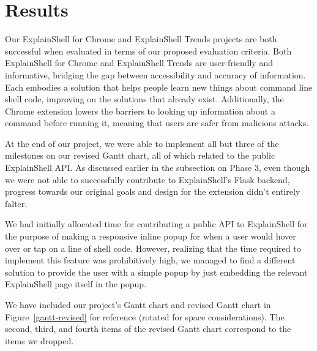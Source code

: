 \documentclass[11pt]{article}
\begin{document}
\section{Results}

Our ExplainShell for Chrome and ExplainShell Trends projects are both successful
when evaluated in terms of our proposed evaluation criteria. Both ExplainShell
for Chrome and ExplainShell Trends are user-friendly and informative, bridging
the gap between accessibility and accuracy of information. Each embodies a
solution that helps people learn new things about command line shell code,
improving on the solutions that already exist. Additionally, the Chrome
extension lowers the barriers to looking up information about a command before
running it, meaning that users are safer from malicious attacks.

At the end of our project, we were able to implement all but three of the
milestones on our revised Gantt chart, all of which related to the public
ExplainShell API. As discussed earlier in the subsection on Phase 3, even though
we were not able to successfully contribute to ExplainShell's Flask backend,
progress towards our original goals and design for the extension didn't entirely
falter.

We had initially allocated time for contributing a public API to
ExplainShell for the purpose of making a responsive inline popup for when a user
would hover over or tap on a line of shell code. However, realizing that the
time required to implement this feature was prohibitively high, we managed to
find a different solution to provide the user with a simple popup by just
embedding the relevant ExplainShell page itself in the popup.

We have included our project's Gantt chart and revised Gantt chart in
Figure~\ref{gantt-revised} for reference (rotated for space considerations). The
second, third, and fourth items of the revised Gantt chart correspond to the
items we dropped.
\end{document}

